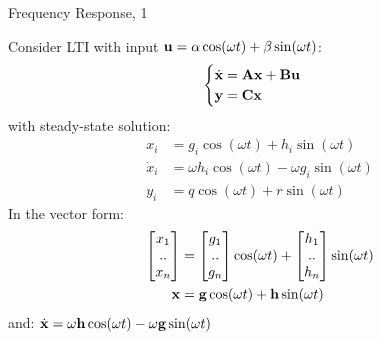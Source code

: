 \documentclass{beamer}
\begin{document}
\begin{frame}{Frequency Response, 1}
	\begin{flushleft}
		
		Consider LTI with input $\mathbf{u} = \alpha \cos(\omega t) + \beta \sin (\omega t)$:
		\begin{equation}
			\begin{cases}
				\dot{\mathbf{x}} = \mathbf{A}\mathbf{x} + \mathbf{B}\mathbf{u}
				\\
				\mathbf{y} = \mathbf{C}\mathbf{x}
			\end{cases}
		\end{equation}
		with steady-state solution:
		\begin{align}
			x_i &= g_i \cos(\omega t) + h_i \sin (\omega t)
			\\
			\dot x_i &=\omega h_i \cos(\omega t) - \omega g_i \sin (\omega t)
			\\
			y_i &= q \cos(\omega t) + r \sin (\omega t)
		\end{align}
		In the vector form:
		\begin{align}
			\begin{bmatrix} x_1 \\ .. \\ x_n \end{bmatrix} 
			&= 
			\begin{bmatrix} g_1 \\ .. \\ g_n \end{bmatrix} \cos(\omega t) + \begin{bmatrix} h_1 \\ .. \\ h_n \end{bmatrix} \sin (\omega t)
			\\
			\mathbf{x}
			&= 
			\mathbf{g} \cos(\omega t) + \mathbf{h} \sin (\omega t)
		\end{align}
		and:
		$
			\dot{\mathbf{x}}
			= 
			\omega \mathbf{h} \cos(\omega t) - \omega \mathbf{g} \sin (\omega t)
		$
		
		
	\end{flushleft}
\end{frame}
\end{document}
